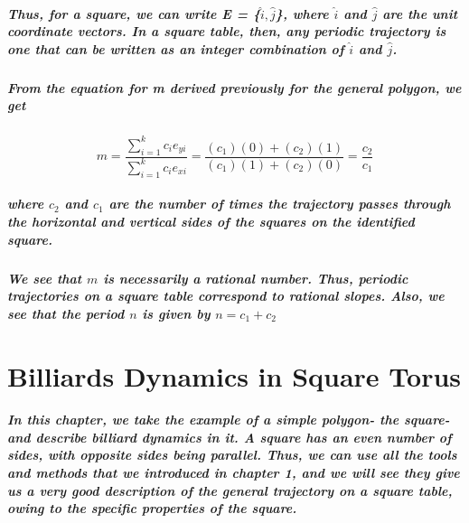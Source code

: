 \documentclass{report}
\begin{document}
\paragraph{Thus, for a square, we can write E = \{$\hat{i},\hat{j}$\}, where $\hat{i}$ and $\hat{j}$ are the unit coordinate vectors. In a square table, then, any periodic trajectory is one that can be written as an integer combination of $\hat{i}$ and $\hat{j}$.}

\paragraph{From the equation for m derived previously for the general polygon, we get}

\begin{equation}
m=\frac{\sum_{i=1}^k  c_ie_{yi} }{\sum_{i=1}^k  c_ie_{xi} }=\frac{(c_1)(0)+(c_2)(1)}{(c_1)(1)+(c_2)(0)}=\frac{c_2}{c_1}
\end{equation}

\paragraph{where $c_2$ and $c_1$ are the number of times the trajectory passes through the horizontal and vertical sides of the squares on the identified square.}

\paragraph{We see that $m$ is necessarily a rational number. Thus, periodic trajectories on a square table correspond to rational slopes. Also, we see that the period $n$ is given by $n = c_1 + c_2$}






\chapter{Billiards Dynamics in Square Torus}

\paragraph{In this chapter, we take the example of a simple polygon- the square- and describe billiard dynamics in it. A square has an even number of sides, with opposite sides being parallel. Thus, we can use all the tools and methods that we introduced in chapter 1, and we will see they give us a very good description of the general trajectory on a square table, owing to the specific properties of the square.}
\end{document}
